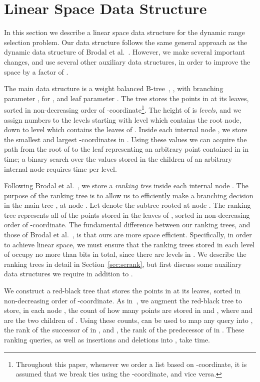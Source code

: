 \documentclass{llncs}
\begin{document}
\section{Linear Space Data Structure\label{sec:lineards}}

In this section we describe a linear space data structure for the
dynamic range selection problem.  Our data structure follows the same
general approach as the dynamic data structure of Brodal et
al.~\cite{BGJS10}.  However, we make several important changes, and
use several other auxiliary data structures, in order to improve the
space by a factor of .

The main data structure is a weight balanced B-tree~\cite{AV03}, ,
with branching parameter , for , and leaf parameter .  The tree  stores the
points in  at its leaves, sorted in non-decreasing order of
-coordinate\footnote{Throughout this paper, whenever we order a
  list based on -coordinate, it is assumed that we break ties using
  the -coordinate, and vice versa.}.  The height of  is  \emph{levels}, and we assign numbers to the
levels starting with level  which contains the root node, down to
level  which contains the leaves of .  Inside each internal
node , we store the smallest and largest -coordinates in
.  Using these values we can acquire the path from the root of
 to the leaf representing an arbitrary point contained in  in
 time; a binary search over the values stored in the
children of an arbitrary internal node requires  time
per level.


Following Brodal et al.~\cite{BGJS10}, we store a \emph{ranking tree}
 inside each internal node .  The purpose of the
ranking tree  is to allow us to efficiently make a branching
decision in the main tree , at node .  Let  denote the
subtree rooted at node .  The ranking tree  represents all of
the points stored in the leaves of , sorted in non-decreasing
order of -coordinate.  The fundamental difference between our
ranking trees, and those of Brodal et al.~\cite{BGJS10}, is that ours
are more space efficient.  Specifically, in order to achieve linear
space, we must ensure that the ranking trees stored in each level of
 occupy no more than  bits in total, since there
are  levels in .  We describe the ranking
trees in detail in Section~\ref{sec:serank}, but first discuss some
auxiliary data structures we require in addition to .


We construct a red-black tree  that stores the points in  at
its leaves, sorted in non-decreasing order of -coordinate.  As
in~\cite{BGJS10}, we augment the red-black tree  to store, in
each node , the count of how many points are stored in  and
, where  and  are the two children of .  Using
these counts,  can be used to map any query  into
, the rank of the successor of  in , and , the rank
of the predecessor of  in .  These ranking queries, as well as
insertions and deletions into , take  time. 
\end{document}
